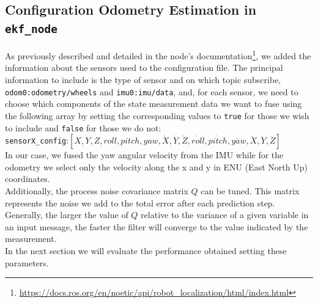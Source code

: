 \subsection{Configuration Odometry Estimation in \texttt{ekf\_node}}
As previously described and detailed in the node’s documentation\footnote{\href{https://docs.ros.org/en/noetic/api/robot_localization/html/index.html}{https://docs.ros.org/en/noetic/api/robot\_localization/html/index.html}}, we added the information about the sensors used to the configuration file. The principal information to include is the type of sensor and on which topic subscribe, \texttt{odom0:odometry/wheels} and \texttt{imu0:imu/data}, and, for each sensor, we need to choose which components of the state measurement data we want to fuse using the following array by setting the corresponding values to \texttt{true} for those we wish to include and \texttt{false} for those we do not:\\
\texttt{sensorX\_config}:$ [X, Y, Z, roll, pitch, yaw, \dot{X}, \dot{Y}, \dot{Z}, \dot{roll}, \dot{pitch}, \dot{yaw}, \ddot{X}, \ddot{Y}, \ddot{Z}] $\\
\alert{In our case, we fused the yaw angular velocity from the IMU while for the odometry we select only the velocity along the x and y in ENU (East North Up) coordinates.\\}
Additionally, the process noise covariance matrix $ Q $ can be tuned. This matrix represents the noise we add to the total error after each prediction step. Generally, the larger the value of $ Q $ relative to the variance of a given variable in an input message, the faster the filter will converge to the value indicated by the measurement.
\alert{\\
In the next section we will evaluate the performance obtained setting these parameters.
}

